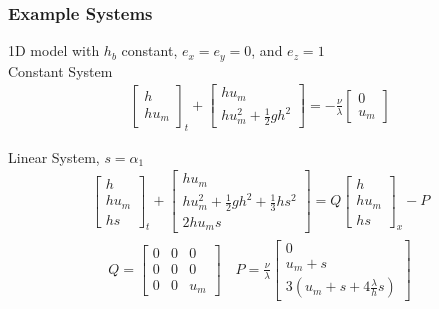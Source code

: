 \documentclass[10pt]{beamer}
\begin{document}
      \begin{frame}
        \frametitle{Example Systems}
        1D model with \(h_b\) constant, \(e_x = e_y = 0\), and \(e_z = 1\) \\
        Constant System
        \begin{align*}
          \begin{bmatrix}
            h \\
            h u_m
          \end{bmatrix}_t +
          \begin{bmatrix}
            h u_m \\
            h u_m^2 + \frac{1}{2} g h^2
          \end{bmatrix} =
          -\frac{\nu}{\lambda}
          \begin{bmatrix}
            0 \\
            u_m
          \end{bmatrix}
        \end{align*}

        Linear System, \(s = \alpha_1\)
        \begin{align*}
          \begin{bmatrix}
            h \\
            hu_m \\
            hs
          \end{bmatrix}_t +
          \begin{bmatrix}
            h u_m \\
            h u_m^2 + \frac{1}{2} gh^2 + \frac{1}{3}hs^2 \\
            2 h u_m s
          \end{bmatrix} = Q
          \begin{bmatrix}
            h \\
            hu_m \\
            hs
          \end{bmatrix}_x - P
        \end{align*}
        \begin{align*}
          Q =
          \begin{bmatrix}
            0 & 0 & 0 \\
            0 & 0 & 0 \\
            0 & 0 & u_m
          \end{bmatrix} \quad
          P = \frac{\nu}{\lambda}
          \begin{bmatrix}
            0 \\
            u_m + s \\
            3(u_m + s + 4\frac{\lambda}{h}s)
          \end{bmatrix}
        \end{align*}
      \end{frame}
\end{document}
